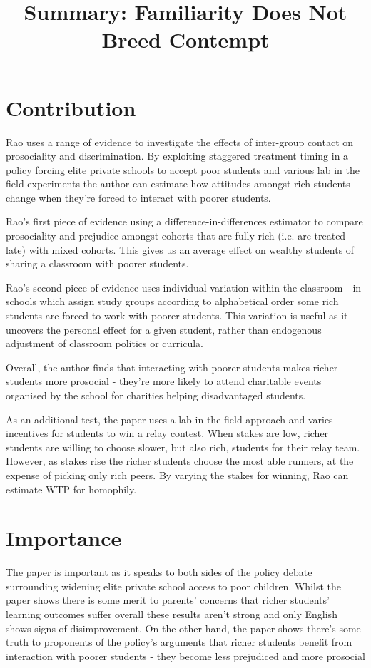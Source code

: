 \documentclass{article}
\title{Summary: Familiarity Does Not Breed Contempt}
\begin{document}
\maketitle


\section*{Contribution}


Rao uses a range of evidence to investigate the effects of inter-group contact 
on prosociality and discrimination. By exploiting staggered treatment timing in 
a policy forcing elite private schools to accept poor students and various 
lab in the field experiments the author can estimate how attitudes amongst rich 
students change when they're forced to interact with poorer students. 


Rao's first piece of evidence using a difference-in-differences estimator to 
compare prosociality and prejudice amongst cohorts that are fully rich (i.e. are 
treated late) with mixed cohorts. This gives us an average effect on wealthy 
students of sharing a classroom with poorer students.

Rao's second piece of evidence uses individual variation within the classroom - 
in schools which assign study groups according to alphabetical order some rich 
students are forced to work with poorer students. This variation is useful as 
it uncovers the personal effect for a given student, rather than endogenous 
adjustment of classroom politics or curricula.

Overall, the author finds that interacting with poorer students makes richer 
students more prosocial - they're more likely to attend charitable events organised 
by the school for charities helping disadvantaged students.

As an additional test, the paper uses a lab in the field approach and varies 
incentives for students to win a relay contest. When stakes are low, richer 
students are willing to choose slower, but also rich, students for their relay team. 
However, as stakes rise the richer students choose the most able runners, at 
the expense of picking only rich peers. By varying the stakes for winning, Rao 
can estimate WTP for homophily.


\section*{Importance}

The paper is important as it speaks to both sides of the policy debate surrounding 
widening elite private school access to poor children. Whilst the paper shows there 
is some merit to parents' concerns that richer students' learning outcomes suffer 
overall these results aren't strong and only English shows signs of disimprovement.
On the other hand, the paper shows there's some truth to proponents of the policy's 
arguments that richer students benefit from interaction with poorer students - 
they become less prejudiced and more prosocial
\end{document}
